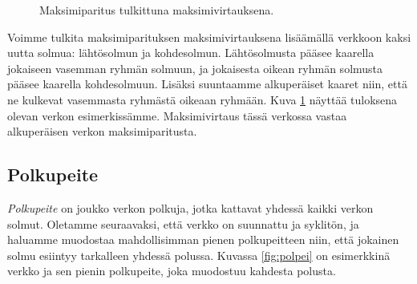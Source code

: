 \begin{figure}
\center
\begin{center}
\end{center}
\caption{Maksimiparitus tulkittuna maksimivirtauksena.}
\label{fig:parver}
\end{figure}

Voimme tulkita maksimiparituksen maksimivirtauksena
lisäämällä verkkoon kaksi uutta solmua: lähtösolmun ja kohdesolmun.
Lähtösolmusta pääsee kaarella jokaiseen vasemman ryhmän solmuun,
ja jokaisesta oikean ryhmän solmusta pääsee kaarella kohdesolmuun.
Lisäksi suuntaamme alkuperäiset kaaret niin,
että ne kulkevat vasemmasta ryhmästä oikeaan ryhmään.
Kuva \ref{fig:parver} näyttää tuloksena olevan verkon
esimerkissämme.
Maksimivirtaus tässä verkossa vastaa alkuperäisen verkon
maksimiparitusta.

\subsection{Polkupeite}

\emph{Polkupeite} on joukko verkon polkuja,
jotka kattavat yhdessä kaikki verkon solmut.
Oletamme seuraavaksi, että verkko on suunnattu ja syklitön,
ja haluamme muodostaa mahdollisimman pienen polkupeitteen
niin, että jokainen solmu esiintyy tarkalleen yhdessä polussa.
Kuvassa \ref{fig:polpei} on esimerkkinä verkko ja sen pienin polkupeite,
joka muodostuu kahdesta polusta.

